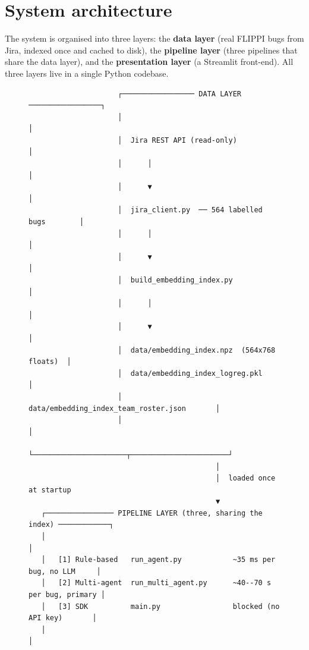 \documentclass[11pt,a4paper]{article}
\begin{document}
\section{System architecture}

The system is organised into three layers: the \textbf{data layer} (real
FLIPPI bugs from Jira, indexed once and cached to disk), the
\textbf{pipeline layer} (three pipelines that share the data layer), and the
\textbf{presentation layer} (a Streamlit front-end). All three layers live
in a single Python codebase.

\begin{figure}[h]
\centering
\begin{minipage}{0.95\textwidth}
\begin{lstlisting}
                     ┌───────────────── DATA LAYER ─────────────────┐
                     │                                              │
                     │  Jira REST API (read-only)                   │
                     │      │                                       │
                     │      ▼                                       │
                     │  jira_client.py  ── 564 labelled bugs        │
                     │      │                                       │
                     │      ▼                                       │
                     │  build_embedding_index.py                    │
                     │      │                                       │
                     │      ▼                                       │
                     │  data/embedding_index.npz  (564x768 floats)  │
                     │  data/embedding_index_logreg.pkl             │
                     │  data/embedding_index_team_roster.json       │
                     │                                              │
                     └──────────────────────┬───────────────────────┘
                                            │
                                            │  loaded once at startup
                                            ▼
   ┌──────────────── PIPELINE LAYER (three, sharing the index) ────────────┐
   │                                                                       │
   │   [1] Rule-based   run_agent.py            ~35 ms per bug, no LLM     │
   │   [2] Multi-agent  run_multi_agent.py      ~40--70 s per bug, primary │
   │   [3] SDK          main.py                 blocked (no API key)       │
   │                                                                       │

\end{lstlisting}
\end{minipage}
\end{figure}
\end{document}
